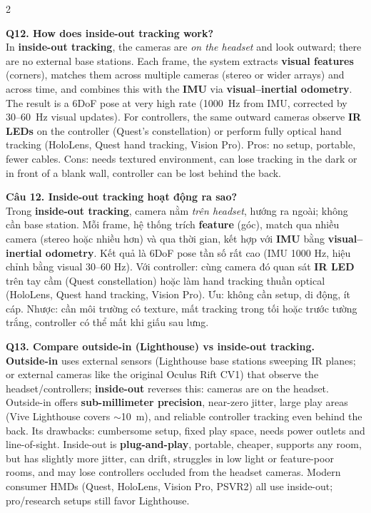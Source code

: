 \begin{paracol}{2}
\switchcolumn*

\textbf{Q12. How does inside-out tracking work?}\\
In \textbf{inside-out tracking}, the cameras are \textit{on the headset} and look outward; there are no external base stations. Each frame, the system extracts \textbf{visual features} (corners), matches them across multiple cameras (stereo or wider arrays) and across time, and combines this with the \textbf{IMU} via \textbf{visual--inertial odometry}. The result is a 6DoF pose at very high rate (1000~Hz from IMU, corrected by 30--60~Hz visual updates). For controllers, the same outward cameras observe \textbf{IR LEDs} on the controller (Quest's constellation) or perform fully optical hand tracking (HoloLens, Quest hand tracking, Vision Pro). Pros: no setup, portable, fewer cables. Cons: needs textured environment, can lose tracking in the dark or in front of a blank wall, controller can be lost behind the back.

\switchcolumn

\textbf{Câu 12. Inside-out tracking hoạt động ra sao?}\\
Trong \textbf{inside-out tracking}, camera nằm \textit{trên headset}, hướng ra ngoài; không cần base station. Mỗi frame, hệ thống trích \textbf{feature} (góc), match qua nhiều camera (stereo hoặc nhiều hơn) và qua thời gian, kết hợp với \textbf{IMU} bằng \textbf{visual--inertial odometry}. Kết quả là 6DoF pose tần số rất cao (IMU 1000 Hz, hiệu chỉnh bằng visual 30--60 Hz). Với controller: cùng camera đó quan sát \textbf{IR LED} trên tay cầm (Quest constellation) hoặc làm hand tracking thuần optical (HoloLens, Quest hand tracking, Vision Pro). Ưu: không cần setup, di động, ít cáp. Nhược: cần môi trường có texture, mất tracking trong tối hoặc trước tường trắng, controller có thể mất khi giấu sau lưng.

\switchcolumn*

\textbf{Q13. Compare outside-in (Lighthouse) vs inside-out tracking.}\\
\textbf{Outside-in} uses external sensors (Lighthouse base stations sweeping IR planes; or external cameras like the original Oculus Rift CV1) that observe the headset/controllers; \textbf{inside-out} reverses this: cameras are on the headset. Outside-in offers \textbf{sub-millimeter precision}, near-zero jitter, large play areas (Vive Lighthouse covers $\sim$10~m), and reliable controller tracking even behind the back. Its drawbacks: cumbersome setup, fixed play space, needs power outlets and line-of-sight. Inside-out is \textbf{plug-and-play}, portable, cheaper, supports any room, but has slightly more jitter, can drift, struggles in low light or feature-poor rooms, and may lose controllers occluded from the headset cameras. Modern consumer HMDs (Quest, HoloLens, Vision Pro, PSVR2) all use inside-out; pro/research setups still favor Lighthouse.


\end{paracol}
